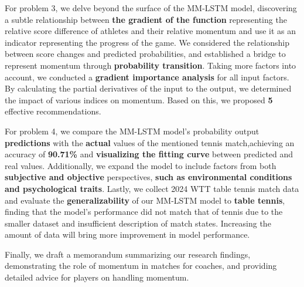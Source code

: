 \documentclass[12pt]{article}
\begin{document}

For problem 3, we delve beyond the surface of the MM-LSTM model, discovering a subtle relationship between\textbf{ the gradient of the function} representing the relative score difference of athletes and their relative momentum and use it as an indicator representing the progress of the game. We considered the relationship between score changes and predicted probabilities, and established a bridge to represent momentum through \textbf{probability transition}. Taking more factors into account, we conducted a \textbf{gradient importance analysis} for all input factors. By calculating the partial derivatives of the input to the output, we determined the impact of various indices on momentum. Based on this, we proposed \textbf{5} effective recommendations.

For problem 4, we compare the MM-LSTM model's probability output \textbf{predictions} with the \textbf{actual} values of the mentioned tennis match,achieving an accuracy of \textbf{ 90.71\% }and \textbf{visualizing the fitting curve} between predicted and real values. Additionally, we expand the model to include factors from both \textbf{subjective and objective }perspectives, \textbf{such as environmental conditions and psychological traits}. Lastly, we collect 2024 WTT table tennis match data and evaluate the \textbf{generalizability} of our MM-LSTM model to \textbf{table tennis}, finding that the model's performance did not match that of tennis due to the smaller dataset and insufficient description of match states. Increasing the amount of data will bring more improvement in model performance.

Finally, we draft a memorandum summarizing our research findings, demonstrating the role of momentum in matches for coaches, and providing detailed advice for players on handling momentum.
\end{document}
